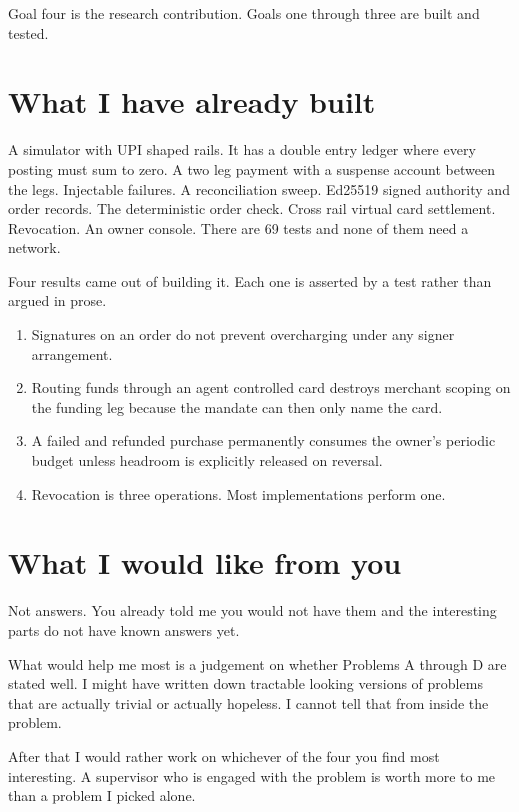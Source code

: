 \documentclass[journal,onecolumn,11pt]{IEEEtran}
\begin{document}
Goal four is the research contribution. Goals one through three are built and tested.

\section{What I have already built}

A simulator with UPI shaped rails. It has a double entry ledger where every posting must
sum to zero. A two leg payment with a suspense account between the legs. Injectable
failures. A reconciliation sweep. Ed25519 signed authority and order records. The
deterministic order check. Cross rail virtual card settlement. Revocation. An owner
console. There are 69 tests and none of them need a network.

Four results came out of building it. Each one is asserted by a test rather than argued
in prose.

\begin{enumerate}[leftmargin=*]
\item Signatures on an order do not prevent overcharging under any signer arrangement.
\item Routing funds through an agent controlled card destroys merchant scoping on the
funding leg because the mandate can then only name the card.
\item A failed and refunded purchase permanently consumes the owner's periodic budget
unless headroom is explicitly released on reversal.
\item Revocation is three operations. Most implementations perform one.
\end{enumerate}

\section{What I would like from you}

Not answers. You already told me you would not have them and the interesting parts do not
have known answers yet.

What would help me most is a judgement on whether Problems A through D are stated well. I
might have written down tractable looking versions of problems that are actually trivial
or actually hopeless. I cannot tell that from inside the problem.

After that I would rather work on whichever of the four you find most interesting. A
supervisor who is engaged with the problem is worth more to me than a problem I picked
alone.
\end{document}
